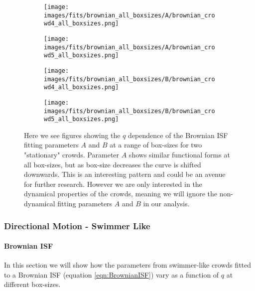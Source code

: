 \documentclass[10pt]{article}
\begin{document}
\begin{figure}[H]
\begin{subfigure}[t]{.5\textwidth}
  \centering
 \texttt{[image: images/fits/brownian\_all\_boxsizes/A/brownian\_crowd4\_all\_boxsizes.png]}
  \caption{}
\end{subfigure}%
\hfill
\begin{subfigure}[t]{.5\textwidth}
  \centering
  \texttt{[image: images/fits/brownian\_all\_boxsizes/A/brownian\_crowd5\_all\_boxsizes.png]}
  \caption{}
\end{subfigure}
\label{fig:crowd_brownian_fits_A_all_boxsizes}
\par\bigskip
\begin{subfigure}[t]{.5\textwidth}
  \centering
 \texttt{[image: images/fits/brownian\_all\_boxsizes/B/brownian\_crowd4\_all\_boxsizes.png]}
  \caption{}
\end{subfigure}%
\hfill
\begin{subfigure}[t]{.5\textwidth}
  \centering
  \texttt{[image: images/fits/brownian\_all\_boxsizes/B/brownian\_crowd5\_all\_boxsizes.png]}
  \caption{}
\end{subfigure}
\caption{Here we see figures showing the $q$ dependence of the Brownian ISF fitting parameters $A$ and $B$ at a range of box-sizes for two "stationary" crowds. Parameter $A$ shows similar functional forms at all box-sizes, but as box-size decreases the curve is shifted downwards. This is an interesting pattern and could be an avenue for further research. However we are only interested in the dynamical properties of the crowds, meaning we will ignore the non-dynamical fitting parameters $A$ and $B$ in our analysis.}
\label{fig:crowd_brownian_fits_tauc_B_boxsizes}
\end{figure}
\clearpage
\subsubsection{Directional Motion - Swimmer Like}
\paragraph{Brownian ISF} In this section we will show how the parameters from swimmer-like crowds fitted to a Brownian ISF (equation \ref{eqn:BrownianISF}) vary as a function of $q$ at different box-sizes.
\end{document}
